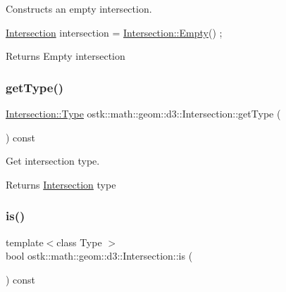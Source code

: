 Constructs an empty intersection. 


\begin{DoxyCode}
\hyperlink{classostk_1_1math_1_1geom_1_1d3_1_1_intersection_a6091ab689809d0da1e670ca18dffb2d8}{Intersection} intersection = \hyperlink{classostk_1_1math_1_1geom_1_1d3_1_1_intersection_ae5b56e75e89a76e9d67827dd99cd777f}{Intersection::Empty}() ;
\end{DoxyCode}


\begin{DoxyReturn}{Returns}
Empty intersection 
\end{DoxyReturn}
\mbox{\label{classostk_1_1math_1_1geom_1_1d3_1_1_intersection_a3c3d6c3c38113ddb2bf6508045f3aca3}} 
\subsubsection{\texorpdfstring{get\+Type()}{getType()}}
{\footnotesize\ttfamily \hyperlink{classostk_1_1math_1_1geom_1_1d3_1_1_intersection_a21196aae3f56795cb11d07afaaaf41c1}{Intersection\+::\+Type} ostk\+::math\+::geom\+::d3\+::\+Intersection\+::get\+Type (\begin{DoxyParamCaption}{ }\end{DoxyParamCaption}) const}



Get intersection type. 

\begin{DoxyReturn}{Returns}
\hyperlink{classostk_1_1math_1_1geom_1_1d3_1_1_intersection}{Intersection} type 
\end{DoxyReturn}
\mbox{\label{classostk_1_1math_1_1geom_1_1d3_1_1_intersection_a44a04db3433ad876b0b00fe195350fde}} 
\subsubsection{\texorpdfstring{is()}{is()}}
{\footnotesize\ttfamily template$<$class Type $>$ \\
bool ostk\+::math\+::geom\+::d3\+::\+Intersection\+::is (\begin{DoxyParamCaption}{ }\end{DoxyParamCaption}) const\hspace{0.3cm}{\ttfamily [inline]}}



